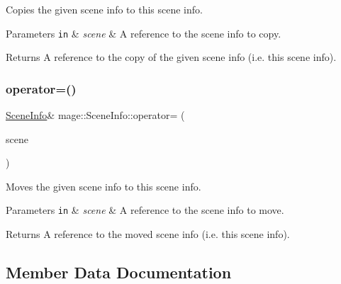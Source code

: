 Copies the given scene info to this scene info.


\begin{DoxyParams}[1]{Parameters}
\mbox{\tt in}  & {\em scene} & A reference to the scene info to copy. \\
\hline
\end{DoxyParams}
\begin{DoxyReturn}{Returns}
A reference to the copy of the given scene info (i.\+e. this scene info). 
\end{DoxyReturn}
\hypertarget{structmage_1_1_scene_info_a61dea73dc9c2f3ca7fdfe70f9bee33ac}{}\label{structmage_1_1_scene_info_a61dea73dc9c2f3ca7fdfe70f9bee33ac} 
\subsubsection{\texorpdfstring{operator=()}{operator=()}\hspace{0.1cm}{\footnotesize\ttfamily [2/2]}}
{\footnotesize\ttfamily \hyperlink{structmage_1_1_scene_info}{Scene\+Info}\& mage\+::\+Scene\+Info\+::operator= (\begin{DoxyParamCaption}\item[{\hyperlink{structmage_1_1_scene_info}{Scene\+Info} \&\&}]{scene }\end{DoxyParamCaption})\hspace{0.3cm}{\ttfamily [default]}}

Moves the given scene info to this scene info.


\begin{DoxyParams}[1]{Parameters}
\mbox{\tt in}  & {\em scene} & A reference to the scene info to move. \\
\hline
\end{DoxyParams}
\begin{DoxyReturn}{Returns}
A reference to the moved scene info (i.\+e. this scene info). 
\end{DoxyReturn}


\subsection{Member Data Documentation}
\hypertarget{structmage_1_1_scene_info_adff390c6f7b8aee3cee4d799cfe10ea7}{}\label{structmage_1_1_scene_info_adff390c6f7b8aee3cee4d799cfe10ea7} 
